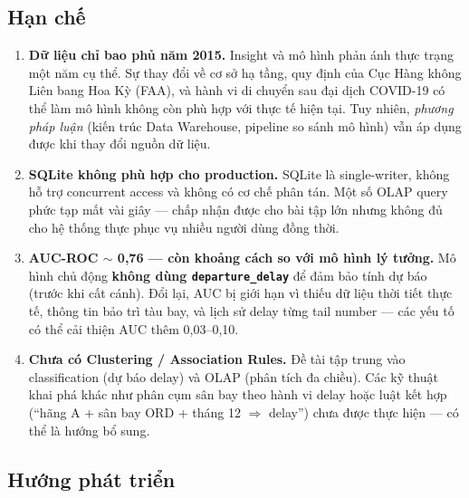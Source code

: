 \subsection{Hạn chế}

\begin{enumerate}
    \item \textbf{Dữ liệu chỉ bao phủ năm 2015.}
    Insight và mô hình phản ánh thực trạng một năm cụ thể.
    Sự thay đổi về cơ sở hạ tầng, quy định của Cục Hàng không Liên bang Hoa Kỳ (FAA),
    và hành vi di chuyển sau đại dịch COVID-19
    có thể làm mô hình không còn phù hợp với thực tế hiện tại.
    Tuy nhiên, \textit{phương pháp luận} (kiến trúc Data Warehouse, pipeline so sánh mô hình)
    vẫn áp dụng được khi thay đổi nguồn dữ liệu.

    \item \textbf{SQLite không phù hợp cho production.}
    SQLite là single-writer, không hỗ trợ concurrent access
    và không có cơ chế phân tán.
    Một số OLAP query phức tạp mất vài giây ---
    chấp nhận được cho bài tập lớn nhưng không đủ cho hệ thống thực
    phục vụ nhiều người dùng đồng thời.

    \item \textbf{AUC-ROC $\sim$ 0{,}76 --- còn khoảng cách so với mô hình lý tưởng.}
    Mô hình chủ động \textbf{không dùng \texttt{departure\_delay}}
    để đảm bảo tính dự báo (trước khi cất cánh).
    Đổi lại, AUC bị giới hạn vì thiếu dữ liệu thời tiết thực tế,
    thông tin bảo trì tàu bay, và lịch sử delay từng tail number ---
    các yếu tố có thể cải thiện AUC thêm 0{,}03--0{,}10.

    \item \textbf{Chưa có Clustering / Association Rules.}
    Đề tài tập trung vào classification (dự báo delay)
    và OLAP (phân tích đa chiều).
    Các kỹ thuật khai phá khác như phân cụm sân bay theo hành vi delay
    hoặc luật kết hợp (``hãng A + sân bay ORD + tháng 12 $\Rightarrow$ delay'')
    chưa được thực hiện --- có thể là hướng bổ sung.
\end{enumerate}

\subsection{Hướng phát triển}

